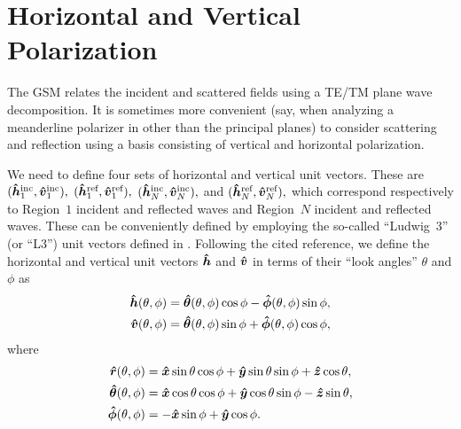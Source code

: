 \section{Horizontal and Vertical Polarization}  The GSM
relates the incident and scattered fields using a TE/TM plane wave
decomposition. It is sometimes more convenient (say, when analyzing a
meanderline polarizer in other than the principal planes) to consider
scattering and reflection using a basis consisting of vertical and
horizontal polarization. 

We need to define four sets of horizontal and vertical unit vectors.
These are $(\hhat\inc_1,\vhat\inc_1),$ $(\hhat\refl_1,\vhat\refl_1),$
$(\hhat\inc_N,\vhat\inc_N),$ and $(\hhat\refl_N,\vhat\refl_N),$ which
correspond respectively to Region~$1$ incident and reflected waves and
Region~$N$ incident and reflected waves.  
These can be conveniently defined by employing the so-called ``Ludwig~3'' (or ``L3'')
unit vectors defined in \cite{ludw:73}. 
Following the cited reference, we define the
horizontal and vertical unit vectors $\hhat$ and $\vhat$ in terms of their
``look angles'' $\theta$ and $\phi$ as
\begin{subequations}
  \begin{align}
    \hhat(\theta,\phi) &= 
                         \thetahat(\theta,\phi) \cos\phi - \phihat(\theta,\phi) \sin\phi, \\
    \vhat(\theta,\phi) &= 
                         \thetahat(\theta,\phi) \sin\phi + \phihat(\theta,\phi) \cos\phi,
  \end{align}
\end{subequations}
where
\begin{subequations}
  \begin{align}
    \boldsymbol{\hat{r}}(\theta,\phi) &= \boldsymbol{\hat{x}}
    \sin\theta\cos\phi + \boldsymbol{\hat{y}}\sin\theta\sin\phi 
    + \boldsymbol{\hat{z}}\cos\theta, \\
    \boldsymbol{\hat{\theta}}(\theta,\phi) &= \boldsymbol{\hat{x}}
    \cos\theta\cos\phi + \boldsymbol{\hat{y}}\cos\theta\sin\phi 
    - \boldsymbol{\hat{z}}\sin\theta, \\
    \boldsymbol{\hat{\phi}}(\theta,\phi) &= -\boldsymbol{\hat{x}} \sin\phi
    + \boldsymbol{\hat{y}}\cos\phi.
  \end{align}
\end{subequations}

